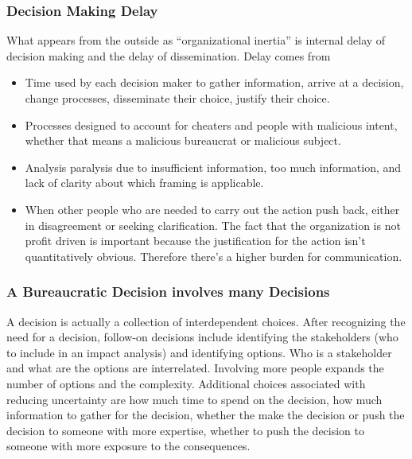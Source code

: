 \subsubsection{Decision Making Delay\label{sec:decision-delay}}

What appears from the outside as ``organizational inertia'' is internal delay of decision making and the delay of dissemination. 
Delay comes from
\begin{itemize}
    \item Time used by each decision maker to gather information, arrive at a decision, change processes, disseminate their choice, justify their choice. 
    \item Processes designed to account for cheaters and people with malicious intent, whether that means a malicious bureaucrat or malicious subject. 
\item Analysis paralysis due to insufficient information, too much information, and lack of clarity about which framing is applicable.
\item When other people who are needed to carry out the action push back, either in disagreement or seeking clarification. The fact that the organization is not profit driven is important because the justification for the action isn't quantitatively obvious. Therefore there's a higher burden for communication.
\end{itemize}




\subsubsection{A Bureaucratic Decision involves many Decisions}

A decision is actually a collection of interdependent choices. After recognizing the need for a decision, follow-on decisions include identifying the stakeholders (who to include in an impact analysis) and identifying options. Who is a stakeholder and what are the options are interrelated. Involving more people expands the number of options and the complexity. Additional choices associated with reducing uncertainty are how much time to spend on the decision, how much information to gather for the decision, whether the make the decision or push the decision to someone with more expertise, whether to push the decision to someone with more exposure to the consequences.

